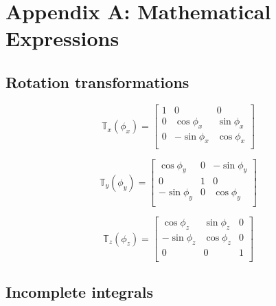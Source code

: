 \section*{Appendix A: Mathematical Expressions\label{appendix:rotational_transformations}}

\subsection*{Rotation transformations}

\begin{equation}
    \mathbb{T}_x(\phi_x)=
    \begin{bmatrix}
        1 & 0 & 0 \\
        0 & \cos\phi_x & \sin\phi_x \\
        0 & -\sin\phi_x & \cos\phi_x \\
    \end{bmatrix}
\end{equation}

\begin{equation}
    \mathbb{T}_y(\phi_y)=
    \begin{bmatrix}
        \cos\phi_y  & 0 & -\sin\phi_y  \\
        0           & 1 & 0            \\
        -\sin\phi_y & 0 & \cos\phi_y   \\
    \end{bmatrix}
\end{equation}

\begin{equation}
    \mathbb{T}_z(\phi_z)=
    \begin{bmatrix}
         \cos\phi_z & \sin\phi_z & 0 \\
        -\sin\phi_z & \cos\phi_z & 0 \\
        0           & 0          & 1 \\
    \end{bmatrix}
\end{equation}

\subsection*{Incomplete integrals}

